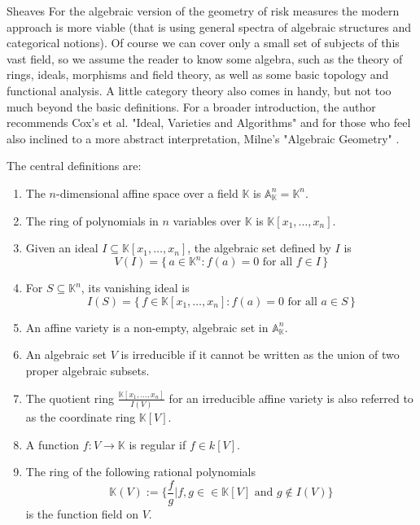 \begin{section}{Sheaves}
For the algebraic
version of the geometry of risk measures the modern approach is more viable (that is using general spectra of algebraic structures and categorical notions).
Of course we can cover only a small set of subjects of this vast field, so we assume the reader to know some algebra,
such as the theory of rings, ideals, morphisms and field theory, as well as some basic topology and functional analysis.
A little category theory also comes in handy, but not too much beyond the basic definitions. 
For a broader introduction, the author recommends Cox's et al. "Ideal, Varieties and Algorithms" \cite{cox2008ideals} and for those who feel also inclined
to a more abstract interpretation, Milne's "Algebraic Geometry" \cite{milne2012algebraic}.
\begin{definition} \label{affinealgeodefs}
    The central definitions are:
\begin{enumerate}
    \item The \( n \)-dimensional affine space over a field \( \mathbb{K} \) is \(\mathbb{A}^n_{\mathbb{K}} = \mathbb{K}^n\).
    \item The ring of polynomials in \( n \) variables over \( \mathbb{K} \) is \( \mathbb{K}[x_1, \ldots, x_n] \).
    \item Given an ideal \( I \subseteq \mathbb{K}[x_1, \ldots, x_n] \), the algebraic set defined by \( I \) is  
        \[ V(I) = \{\, a \in \mathbb{K}^n : f(a) = 0 \text{ for all } f \in I \,\} \]
    \item For \( S \subseteq \mathbb{K}^n \), its vanishing ideal is  
       \[
       I(S) = \{\, f \in \mathbb{K}[x_1, \ldots, x_n] : f(a) = 0 \text{ for all } a \in S \,\}
       \]
    \item An affine variety is a non-empty, algebraic set in \( \mathbb{A}^n_\mathbb{K} \).
    \item An algebraic set \( V \) is irreducible if it cannot be written as the union of two proper algebraic subsets.
   \item The quotient ring \( \frac{\mathbb{K}[x_1, \ldots, x_n]}{I(V)} \) for an irreducible affine variety is 
       also referred to as the coordinate ring \( \mathbb{K}[V] \).
   \item A function \( f : V \to \mathbb{K} \) is regular if \( f \in k[V] \).
   \item The ring of the following rational polynomials 
       \[ 
           \mathbb{K}(V) := \{ \frac{f}{g} | f, g \in \in \mathbb{K}[V] \text{ and } g \notin I(V) \} 
       \]
       is the function field on \( V \).

\end{enumerate}
\end{definition}
\end{section}
